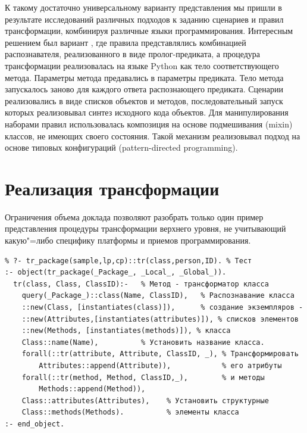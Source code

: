 \documentclass[12pt]{article}
\begin{document}
К такому достаточно универсальному варианту представления мы пришли в результате исследований различных подходов к заданию сценариев и правил трансформации, комбинируя различные языки программирования.  Интересным решением был вариант \cite{b2}, где правила представлялись комбинацией распознавателя, реализованного в виде пролог-предиката, а процедура трансформации реализовалась на языке Python как тело соответствующего метода.  Параметры метода предавались в параметры предиката.  Тело метода запускалось заново для каждого ответа распознающего предиката.  Сценарии реализовались в виде списков объектов и методов, последовательный запуск которых реализовывал синтез исходного кода объектов.  Для манипулирования наборами правил использовалась композиция на основе подмешивания (mixin) классов, не имеющих своего состояния.  Такой механизм реализовывал подход на основе типовых конфигураций (pattern-directed programming).

\section{Реализация трансформации}

Ограничения объема доклада позволяют разобрать только один пример представления процедуры трансформации верхнего уровня, не учитывающий какую"=либо специфику платформы и приемов программирования.
\begin{verbatim}
% ?- tr_package(sample,lp,cp)::tr(class,person,ID). % Тест
:- object(tr_package(_Package_, _Local_, _Global_)).
  tr(class, Class, ClassID):-   % Метод - трансформатор класса
    query(_Package_)::class(Name, ClassID),   % Распознавание класса
    ::new(Class, [instantiates(class)]),      % создание экземпляров -
    ::new(Attributes,[instantiates(attributes)]), % списков элементов
    ::new(Methods, [instantiates(methods)]), % класса
    Class::name(Name),          % Установить название класса.
    forall(::tr(attribute, Attribute, ClassID, _), % Трансформировать
        Attributes::append(Attribute)),            % его атрибуты
    forall(::tr(method, Method, ClassID,_),        % и методы
        Methods::append(Method)),
    Class::attributes(Attributes),    % Установить структурные
    Class::methods(Methods).          % элементы класса
:- end_object.
\end{verbatim}
\end{document}

